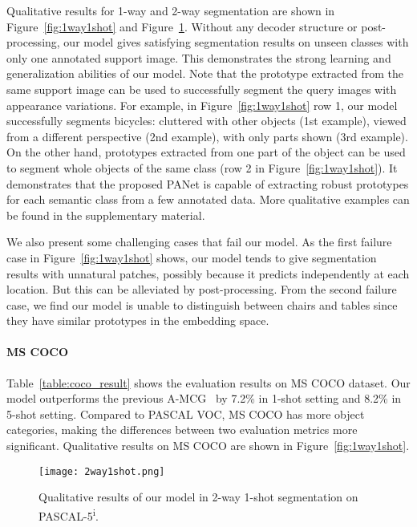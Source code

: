 \documentclass[10pt,twocolumn,letterpaper]{article}
\begin{document}
Qualitative results for 1-way and 2-way segmentation are shown in Figure~\ref{fig:1way1shot} and Figure~\ref{fig:2way1shot}. Without any decoder structure or post-processing, our model gives satisfying segmentation results on unseen classes with only one annotated support image. This demonstrates the strong learning  and generalization abilities of our model. Note that the prototype extracted from the same support image can be used to successfully segment the query images with appearance variations. For example, in Figure~\ref{fig:1way1shot} row 1, our model successfully segments bicycles: cluttered with other objects (1st example), viewed from a different perspective (2nd example), with only parts shown (3rd example). On the other hand, prototypes extracted from one part of the object can be used to segment whole objects of the same class (row 2 in Figure~\ref{fig:1way1shot}). It demonstrates that the proposed PANet is capable of extracting robust prototypes for each semantic class from a few annotated data. More qualitative examples can be found in the supplementary material.

We also present some challenging cases that fail our model. As the first failure case in Figure~\ref{fig:1way1shot} shows, our model tends to give segmentation results with unnatural patches, possibly because it predicts independently at each location. But this can be alleviated by post-processing. From the second failure case, we find our model is unable to distinguish between chairs and tables since they have similar prototypes in the embedding space.

\vspace{-10pt}
 \paragraph{MS COCO} Table~\ref{table:coco_result} shows the evaluation results on MS COCO dataset. Our model outperforms the previous A-MCG~\cite{Hu2018AttentionbasedMG}  by 7.2\% in 1-shot setting and 8.2\% in 5-shot setting. Compared to PASCAL VOC, MS COCO has more object categories, making the differences between two evaluation metrics more significant. Qualitative results on MS COCO are shown in Figure~\ref{fig:1way1shot}.


\begin{figure}[t!]
\begin{center}
   \texttt{[image: 2way1shot.png]}
\end{center}
   \caption{Qualitative results of our model in 2-way 1-shot segmentation on PASCAL-5\textsuperscript{i}.}
\label{fig:2way1shot}
\end{figure}
\end{document}
